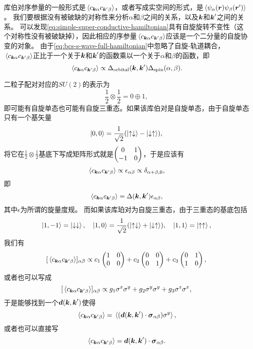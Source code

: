 库伯对序参量的一般形式是$\expval*{{c}_{\vb*{k}\alpha} {c}_{\vb*{k}' \beta}}$，或者写成实空间的形式，是$\expval*{\psi_\alpha(\vb*{r}) \psi_\beta(\vb*{r}')}$。
我们要根据没有被破缺的对称性来分析$\alpha$和$\beta$之间的关系，以及$\vb*{k}$和$\vb*{k}'$之间的关系。
可以发现\eqref{eq:simple-super-conductive-hamiltonian}具有自旋旋转不变性（这个对称性没有被破缺掉），因此相应的序参量$\expval*{{c}_{\vb*{k} \alpha} {c}_{\vb*{k}' \beta}}$应该是一个二分量的自旋协变的对象。
由于\eqref{eq:bcs-s-wave-full-hamiltonian}中忽略了自旋-轨道耦合，$\expval*{{c}_{\vb*{k}\alpha} {c}_{\vb*{k}' \beta}}$正比于一个关于$\vb*{k}$和$\vb*{k}'$的函数乘以一个关于$\alpha$和$\beta$的函数，即
\[
    \expval*{{c}_{\vb*{k} \alpha} {c}_{\vb*{k}' \beta}} \propto \Delta_\text{orbital} (\vb*{k}, \vb*{k}') \Delta_\text{spin} (\alpha, \beta).
\]

二粒子配对对应的$SU(2)$的表示为
\[
    \frac{1}{2} \otimes \frac{1}{2} = 0 \oplus 1,
\]
即可能有自旋单态也可能有自旋三重态。如果该库伯对是自旋单态，由于自旋单态只有一个基矢量
\[
    \ket{0, 0} = \frac{1}{\sqrt{2}} (\ket{\uparrow \downarrow} - \ket{\downarrow \uparrow}),
\]
将它在$\frac{1}{2} \otimes \frac{1}{2}$基底下写成矩阵形式就是$\pmqty{0 & 1 \\ -1 & 0}$，于是应该有
\[
    \expval*{{c}_{\vb*{k} \alpha} {c}_{ \vb*{k}' \beta}} \propto \epsilon_{\alpha \beta} \propto \delta_{\alpha+\beta,0},
\]
即
\begin{equation}
    \expval*{{c}_{\vb*{k} \alpha} {c}_{ \vb*{k}' \beta}} = \Delta(\vb*{k}, \vb*{k}') \epsilon_{\alpha \beta}, 
\end{equation}
其中$\epsilon$为所谓的旋量度规。
而如果该库珀对为自旋三重态，由于三重态的基底包括
\[
    \ket{1, -1} = \ket{\downarrow \downarrow}, \quad \ket{1, 0} = \frac{1}{\sqrt{2}} (\ket{\uparrow \downarrow} + \ket{\downarrow \uparrow}), \quad \ket{1, 1} = \ket{\uparrow \uparrow},
\]
我们有
\[
    [\expval*{{c}_{\vb*{k} \alpha} {c}_{ \vb*{k}' \beta}}]_{\alpha \beta} \propto c_1 \pmqty{1 & 0 \\ 0 & 0} + c_2 \pmqty{0 & 0 \\ 0 & 1} + c_3 \pmqty{0 & 1 \\ 1 & 0} ,
\]
或者也可以写成
\[
    [\expval*{{c}_{\vb*{k} \alpha} {c}_{ \vb*{k}' \beta}}]_{\alpha \beta} \propto g_1 \sigma^x \sigma^y + g_2 \sigma^y \sigma^y + g_3 \sigma^z \sigma^x,
\]
于是能够找到一个$\vb*{d}(\vb*{k}, \vb*{k}')$使得
\begin{equation}
    \expval*{{c}_{\vb*{k} \alpha} {c}_{ \vb*{k}' \beta}} = \expval*{(\vb*{d}(\vb*{k}, \vb*{k}') \cdot \vb*{\sigma}_{\alpha \beta}) \sigma^y},
\end{equation}
或者也可以直接写
\begin{equation}
    \expval*{{c}_{\vb*{k} \alpha} {c}_{ \vb*{k}' \beta}} = \vb*{d}(\vb*{k}, \vb*{k}') \cdot \vb*{\sigma}_{\alpha \beta}.
\end{equation}

